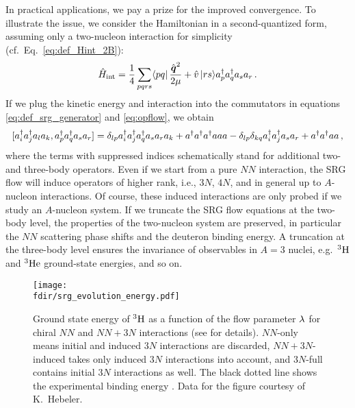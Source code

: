 In practical applications, we pay a prize for the improved convergence.
To illustrate the issue, we consider the Hamiltonian in a second-quantized 
form, assuming only a two-nucleon interaction for simplicity (cf.~Eq.~\eqref{eq:def_Hint_2B}):
\begin{equation}\label{eq:H}
  \Hint = \frac{1}{4}\sum_{pqrs} \matrixe{pq}{\frac{\qOV^2}{2\mu}+\vO}{rs}\aaO_p\aaO_q\aO_s\aO_r\,.
\end{equation}
If we plug the kinetic energy and interaction into the commutators in 
equations \eqref{eq:def_srg_generator} and \eqref{eq:opflow}, we obtain
\begin{equation}\label{eq:comm2B_vac}
  \comm{\aaO_i\aaO_j\aO_l\aO_k}{\aaO_p\aaO_q\aO_s\aO_r}=
  \delta_{lp}\aaO_i\aaO_j\aaO_q\aO_s\aO_r\aO_k + \aaO\aaO\aaO\aO\aO\aO
  -\delta_{lp}\delta_{kq}\aaO_i\aaO_j\aO_s\aO_r + \aaO\aaO\aO\aO\,, 
\end{equation}
where the terms with suppressed indices schematically stand for additional 
two- and three-body operators. Even if we start from a pure $NN$
interaction, the SRG flow will induce operators of higher rank, i.e., 
$3N$, $4N$, and in general up to $A$-nucleon interactions. Of course, 
these induced interactions are only probed if we study an $A$-nucleon 
system. If we truncate the SRG flow equations at the two-body level, 
the properties of the two-nucleon system are preserved, in particular
the $NN$ scattering phase shifts and the deuteron binding energy. A 
truncation at the three-body level ensures the invariance of observables 
in $A=3$ nuclei, e.g.~$\nuc{H}{3}$ and $\nuc{He}{3}$ ground-state energies, 
and so on. 


\begin{figure*}[t]
  \setlength{\unitlength}{\textwidth}
  \begin{center}
    \texttt{[image: \\fdir/srg\_evolution\_energy.pdf]}
  \end{center}  
  \vspace{-10pt}
  \caption{\label{fig:triton}Ground state energy of $\nuc{H}{3}$ as a function 
  of the flow parameter $\lambdaSRG$ for chiral \NNLO{} $NN$ and $NN\!+\!3N$ 
  interactions (see \cite{Hebeler:2012ly} for details). $NN$-only means initial and 
  induced $3N$ interactions are discarded, $NN\!+\!3N$-induced takes only 
  induced $3N$ interactions into account, and $3N$-full contains initial
  $3N$ interactions as well. The black dotted line shows the experimental 
  binding energy \cite{Wang:2012uq}. Data for the figure courtesy of 
  K.~Hebeler.}
\end{figure*}

